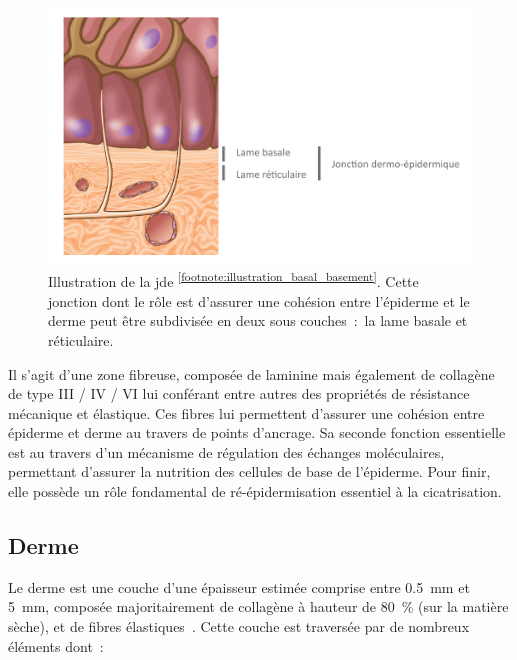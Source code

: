 \begin{figure}[H]
    \centering
    \includegraphics[width=\linewidth]{contents/chapter_1/resources/illustration_basal_basement.pdf}
    \caption{Illustration de la \acrlong{jde} \textsuperscript{\ref{footnote:illustration_basal_basement}}. Cette jonction dont le rôle est d'assurer une cohésion entre l'épiderme et le derme peut être subdivisée en deux sous couches~:~la lame basale et réticulaire.}
    \label{fig:illustration_basal_basement}
\end{figure}\par

\addtocounter{footnote}{1}

Il s’agit d’une zone fibreuse, composée de laminine mais également de collagène de type III / IV / VI lui conférant entre autres des propriétés de résistance mécanique et élastique. Ces fibres lui permettent d’assurer une cohésion entre épiderme et derme au travers de points d’ancrage. Sa seconde fonction essentielle est au travers d’un mécanisme de régulation des échanges moléculaires, permettant d’assurer la nutrition des cellules de base de l’épiderme. Pour finir, elle possède un rôle fondamental de ré-épidermisation essentiel à la cicatrisation.\par
\clearpage

\subsection{Derme}
Le derme est une couche d’une épaisseur estimée comprise entre \SI{0,5}{\milli\metre} et \SI{5}{\milli\metre}, composée majoritairement de collagène à hauteur de 80~\% (sur la matière sèche), et de fibres élastiques~\cite{McGrath2010}. Cette couche est traversée par de nombreux éléments dont~:~

